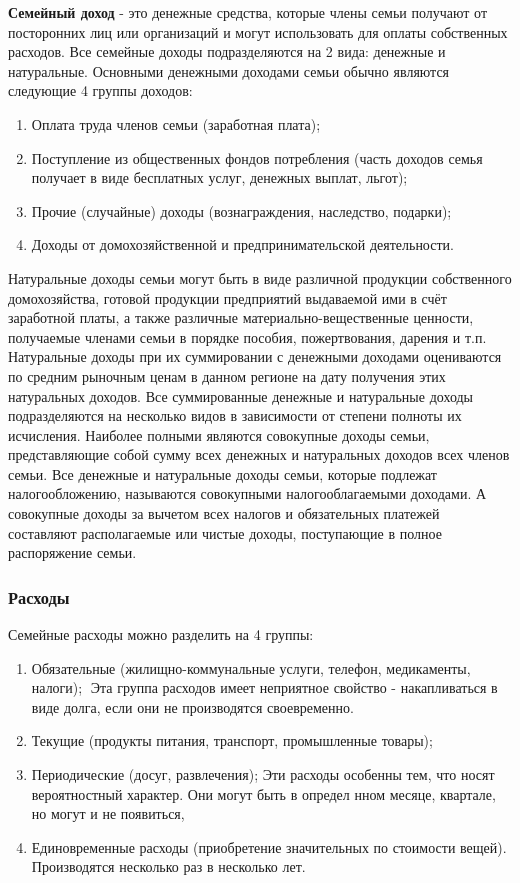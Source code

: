 \textbf{Семейный доход} - это денежные средства, которые члены семьи получают
от посторонних лиц или организаций и могут использовать для оплаты собственных расходов. Все семейные доходы подразделяются на 2 вида:
денежные и натуральные. Основными денежными доходами семьи обычно
являются следующие 4 группы доходов:
\begin{enumerate}
\item Оплата труда членов семьи (заработная плата);
\item Поступление из общественных фондов потребления (часть доходов семья получает в виде бесплатных услуг, денежных выплат, льгот);
\item Прочие (случайные) доходы (вознаграждения, наследство, подарки);
\item Доходы от домохозяйственной и предпринимательской деятельности.
\end{enumerate}
Натуральные доходы семьи могут быть в виде различной продукции собственного домохозяйства, готовой продукции предприятий выдаваемой ими
в счёт заработной платы, а также различные материально-вещественные ценности, получаемые членами семьи в порядке пособия, пожертвования, дарения и т.п. Натуральные доходы при их суммировании с денежными доходами
оцениваются по средним рыночным ценам в данном регионе на дату получения этих натуральных доходов.
Все суммированные денежные и натуральные доходы подразделяются на
несколько видов в зависимости от степени полноты их исчисления. Наиболее
полными являются совокупные доходы семьи, представляющие собой сумму всех денежных и натуральных доходов всех членов семьи. Все денежные
и натуральные доходы семьи, которые подлежат налогообложению, называются совокупными налогооблагаемыми доходами. А совокупные доходы за
вычетом всех налогов и обязательных платежей составляют располагаемые
или чистые доходы, поступающие в полное распоряжение семьи.

\subsubsection{Расходы}
Семейные расходы можно разделить на 4 группы:
\begin{enumerate}
\item Обязательные (жилищно-коммунальные услуги, телефон, медикаменты,
налоги);
Эта группа расходов имеет неприятное свойство - накапливаться в виде
долга, если они не производятся своевременно.
\item Текущие (продукты питания, транспорт, промышленные товары);
\item Периодические (досуг, развлечения); Эти расходы особенны тем, что носят вероятностный характер. Они могут быть в определ нном месяце, квартале, но могут и не появиться,
\item Единовременные расходы (приобретение значительных по стоимости вещей).
Производятся несколько раз в несколько лет.
\end{enumerate}

